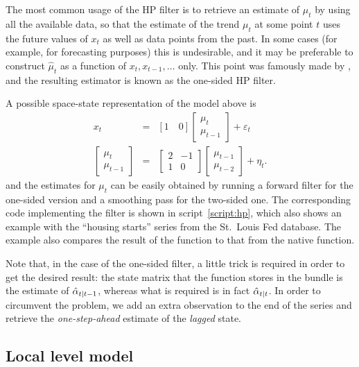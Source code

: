The most common usage of the HP filter is to retrieve an estimate of
$\mu_t$ by using all the available data, so that the estimate of the
trend $\mu_t$ at some point $t$ uses the future values of $x_t$ as
well as data points from the past. In some cases (for example, for
forecasting purposes) this is undesirable, and it may be preferable to
construct $\hat{\mu}_t$ as a function of $x_t, x_{t-1}, \ldots$
only. This point was famously made by \cite{stock-watson1999}, and the
resulting estimator is known as the one-sided HP filter.

A possible space-state representation of the model above is
\begin{eqnarray*}
  x_t & = & [1 \quad 0]
            \left[ \begin{array}{c} \mu_t \\ \mu_{t-1}\end{array}\right]
  + \varepsilon_t \\
  \left[ \begin{array}{c} \mu_t \\ \mu_{t-1}\end{array}\right] & = & 
  \left[ \begin{array}{rr} 2 & -1 \\ 1 & 0 \end{array}\right]
  \left[ \begin{array}{c} \mu_{t-1} \\ \mu_{t-2}\end{array}\right] +
  \eta_t .
\end{eqnarray*}
and the estimates for $\mu_t$ can be easily obtained by running a
forward filter for the one-sided version and a smoothing pass for the
two-sided one. The corresponding code implementing the filter is shown
in script~\ref{script:hp}, which also shows an example with the
``housing starts'' series from the St.~Louis Fed database. The example
also compares the result of the function to that from the native
 function.
  
Note that, in the case of the one-sided filter, a little trick is
required in order to get the desired result: the state matrix that the
 function stores in the bundle is the estimate of
$\hat{\alpha}_{t|t-1}$, whereas what is required is in fact
$\hat{\alpha}_{t|t}$. In order to circumvent the problem, we add an
extra observation to the end of the series and retrieve the
\emph{one-step-ahead} estimate of the \emph{lagged} state.

\subsection{Local level model}
\label{sec:example_loclev}

